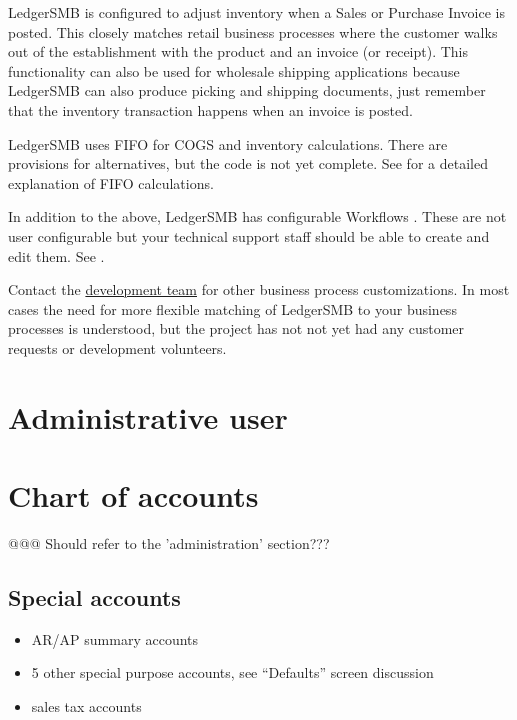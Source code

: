 LedgerSMB is configured to adjust inventory  when a Sales or Purchase Invoice is posted. This closely matches retail business processes where the customer walks out of the establishment with the product and an invoice  (or receipt).  This functionality can also be used for wholesale shipping applications because LedgerSMB can also produce picking  and  shipping documents, just remember that the inventory transaction happens when an invoice is posted.

LedgerSMB uses \gls{FIFO}  for \gls{COGS}  and inventory calculations.  There are provisions for alternatives, but the code is not yet complete. See  for a detailed explanation of  \gls{FIFO} calculations.

In addition to the above, LedgerSMB has configurable Workflows . These are not user configurable but your technical support staff should be able to create and edit them. See .

Contact the \href{https://ledgersmb.org}{development team} for other business process customizations.  In most cases the need for more flexible matching of LedgerSMB to your business processes is understood, but the project has not not yet had any customer requests or development volunteers.

\section{Administrative user}
\label{sec-company-config-admin-user}

\section{Chart of accounts}
\label{sec-company-config-coa}

@@@ Should refer to the 'administration' section???

\subsection{Special accounts}
\label{subsec-company-config-coa-special-accounts}

\begin{itemize}
\item AR/AP summary accounts
\item 5 other special purpose accounts, see ``Defaults'' screen discussion
\item sales tax accounts
\end{itemize}


